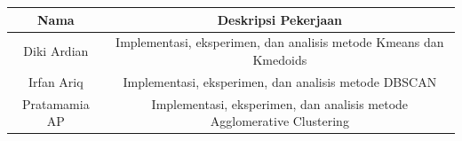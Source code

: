 \documentclass[11pt]{article}
\begin{document}
\begin{longtable}[c]{@{}cc@{}}
\toprule
\begin{minipage}[b]{0.17\columnwidth}\centering\strut
Nama
\strut\end{minipage} &
\begin{minipage}[b]{0.77\columnwidth}\centering\strut
Deskripsi Pekerjaan
\strut\end{minipage}\tabularnewline
\midrule
\endhead
\begin{minipage}[t]{0.17\columnwidth}\centering\strut
Diki Ardian
\strut\end{minipage} &
\begin{minipage}[t]{0.77\columnwidth}\centering\strut
Implementasi, eksperimen, dan analisis metode Kmeans dan Kmedoids
\strut\end{minipage}\tabularnewline
\begin{minipage}[t]{0.17\columnwidth}\centering\strut
Irfan Ariq
\strut\end{minipage} &
\begin{minipage}[t]{0.77\columnwidth}\centering\strut
Implementasi, eksperimen, dan analisis metode DBSCAN
\strut\end{minipage}\tabularnewline
\begin{minipage}[t]{0.17\columnwidth}\centering\strut
Pratamamia AP
\strut\end{minipage} &
\begin{minipage}[t]{0.77\columnwidth}\centering\strut
Implementasi, eksperimen, dan analisis metode Agglomerative Clustering
\strut\end{minipage}\tabularnewline
\bottomrule
\end{longtable}


    
    
    
    
\end{document}
